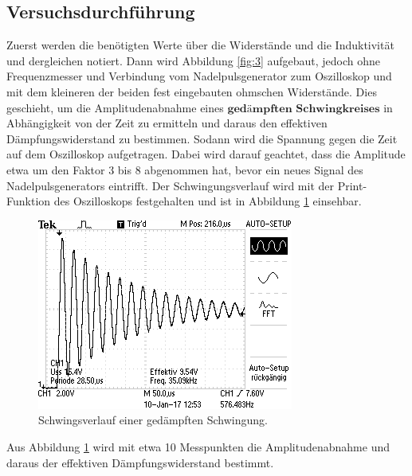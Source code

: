 \subsection{Versuchsdurchführung}
Zuerst werden die benötigten Werte über die Widerstände und die Induktivität und dergleichen
notiert. Dann wird Abbildung \ref{fig:3} aufgebaut, jedoch ohne Frequenzmesser und Verbindung
vom Nadelpulsgenerator zum Oszilloskop und mit dem kleineren der beiden fest eingebauten
ohmschen Widerstände. Dies geschieht, um die Amplitudenabnahme eines
$\textbf{gedämpften Schwingkreises}$ in Abhängigkeit von der Zeit zu ermitteln und daraus
den effektiven Dämpfungswiderstand zu bestimmen. Sodann wird die Spannung gegen die Zeit auf
dem Oszilloskop aufgetragen. Dabei wird darauf geachtet, dass die Amplitude etwa um den Faktor
3 bis 8 abgenommen hat, bevor ein neues Signal des Nadelpulsgenerators eintrifft. Der Schwingungsverlauf
wird mit der Print-Funktion des Oszilloskops festgehalten und ist in Abbildung \ref{fig:5} einsehbar.
\begin{figure}
  \centering
  \includegraphics[scale=0.5]{A.png}
  \caption{Schwingsverlauf einer gedämpften Schwingung.}
  \label{fig:5}
\end{figure}
Aus Abbildung \ref{fig:5} wird mit etwa 10 Messpunkten die Amplitudenabnahme und
daraus der effektiven Dämpfungswiderstand bestimmt.

